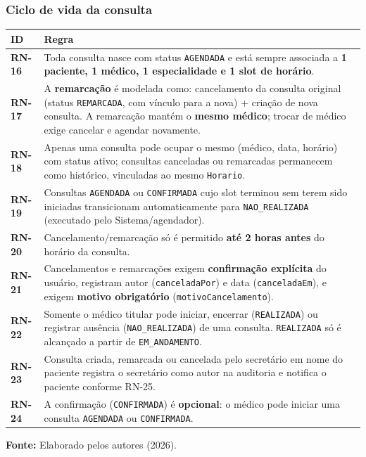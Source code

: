 \documentclass[12pt,a4paper]{article}
\newcommand{\fonte}[1]{%
  \par\vspace{2pt}%
  {\footnotesize\raggedright\textbf{Fonte:} #1\par}%
}
\begin{document}
\subsubsection{Ciclo de vida da consulta}

\begin{table}[H]
\centering
{\footnotesize
\begin{tabularx}{\textwidth}{@{}>{\raggedright\arraybackslash}p{1.8cm}>{\raggedright\arraybackslash}X@{}}
\toprule
ID & Regra \\
\midrule
\textbf{RN-16} & Toda consulta nasce com status \texttt{AGENDADA} e está sempre associada a \textbf{1 paciente, 1 médico, 1 especialidade e 1 slot de horário}. \\
\textbf{RN-17} & A \textbf{remarcação} é modelada como: cancelamento da consulta original (status \texttt{REMARCADA}, com vínculo para a nova) + criação de nova consulta. A remarcação mantém o \textbf{mesmo médico}; trocar de médico exige cancelar e agendar novamente. \\
\textbf{RN-18} & Apenas uma consulta pode ocupar o mesmo (médico, data, horário) com status ativo; consultas canceladas ou remarcadas permanecem como histórico, vinculadas ao mesmo \texttt{Horario}. \\
\textbf{RN-19} & Consultas \texttt{AGENDADA} ou \texttt{CONFIRMADA} cujo slot terminou sem terem sido iniciadas transicionam automaticamente para \texttt{NAO\_REALIZADA} (executado pelo Sistema/agendador). \\
\textbf{RN-20} & Cancelamento/remarcação só é permitido \textbf{até 2 horas antes} do horário da consulta. \\
\textbf{RN-21} & Cancelamentos e remarcações exigem \textbf{confirmação explícita} do usuário, registram autor (\texttt{canceladaPor}) e data (\texttt{canceladaEm}), e exigem \textbf{motivo obrigatório} (\texttt{motivoCancelamento}). \\
\textbf{RN-22} & Somente o médico titular pode iniciar, encerrar (\texttt{REALIZADA}) ou registrar ausência (\texttt{NAO\_REALIZADA}) de uma consulta. \texttt{REALIZADA} só é alcançado a partir de \texttt{EM\_ANDAMENTO}. \\
\textbf{RN-23} & Consulta criada, remarcada ou cancelada pelo secretário em nome do paciente registra o secretário como autor na auditoria e notifica o paciente conforme RN-25. \\
\textbf{RN-24} & A confirmação (\texttt{CONFIRMADA}) é \textbf{opcional}: o médico pode iniciar uma consulta \texttt{AGENDADA} ou \texttt{CONFIRMADA}. \\
\bottomrule
\end{tabularx}
}
\fonte{Elaborado pelos autores (2026).}
\end{table}
\end{document}
